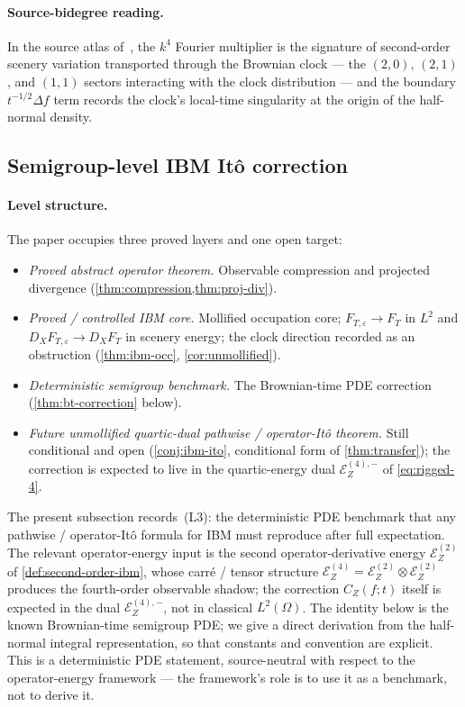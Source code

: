 \documentclass[11pt,reqno]{amsart}
\theoremstyle{plain}
\theoremstyle{definition}
\theoremstyle{remark}
\newcommand{\Energy}{\mathcal{E}}
\newcommand{\IBM}{Z}
\begin{document}
\paragraph{Source-bidegree reading.}
In the source atlas of~\cite{Fontes-IBMchaos}, the $k^{4}$ Fourier
multiplier is the signature of second-order scenery variation
transported through the Brownian clock --- the $(2,0)$, $(2,1)$, and
$(1,1)$ sectors interacting with the clock distribution --- and the
boundary $t^{-1/2}\Delta f$ term records the clock's local-time
singularity at the origin of the half-normal density.

\subsection*{Semigroup-level IBM It\^o correction}

\paragraph{Level structure.}
The paper occupies three proved layers and one open target:
\begin{itemize}
\item[\textbf{(L1)}] \emph{Proved abstract operator theorem.}
  Observable compression and projected divergence
  (\cref{thm:compression,thm:proj-div}).
\item[\textbf{(L2)}] \emph{Proved / controlled IBM core.}
  Mollified occupation core; $F_{T,\varepsilon}\to F_T$ in $L^{2}$ and
  $D_X F_{T,\varepsilon}\to D_X F_T$ in scenery energy; the clock
  direction recorded as an obstruction
  (\cref{thm:ibm-occ}, \cref{cor:unmollified}).
\item[\textbf{(L3)}] \emph{Deterministic semigroup benchmark.}
  The Brownian-time PDE correction (\cref{thm:bt-correction} below).
\item[\textbf{(L4)}] \emph{Future unmollified quartic-dual
  pathwise / operator-It\^o theorem.} Still conditional and open
  (\cref{conj:ibm-ito}, conditional form of \cref{thm:transfer});
  the correction is expected to live in the quartic-energy dual
  $\Energy_\IBM^{(4),-}$ of \eqref{eq:rigged-4}.
\end{itemize}

The present subsection records~(L3): the deterministic PDE
benchmark that any pathwise / operator-It\^o formula for IBM must
reproduce after full expectation. The relevant operator-energy
input is the second operator-derivative energy $\Energy_\IBM^{(2)}$
of \cref{def:second-order-ibm}, whose carr\'e / tensor structure
$\Energy_\IBM^{(4)}=\Energy_\IBM^{(2)}\otimes\Energy_\IBM^{(2)}$
produces the fourth-order observable shadow; the correction
$C_\IBM(f;t)$ itself is expected in the dual
$\Energy_\IBM^{(4),-}$, not in classical $L^{2}(\Omega)$. The identity below is the known Brownian-time
semigroup PDE; we give a direct derivation from the half-normal
integral representation, so that constants and convention are
explicit. This is a deterministic PDE statement, source-neutral with
respect to the operator-energy framework --- the framework's role is
to use it as a benchmark, not to derive it.
\end{document}

